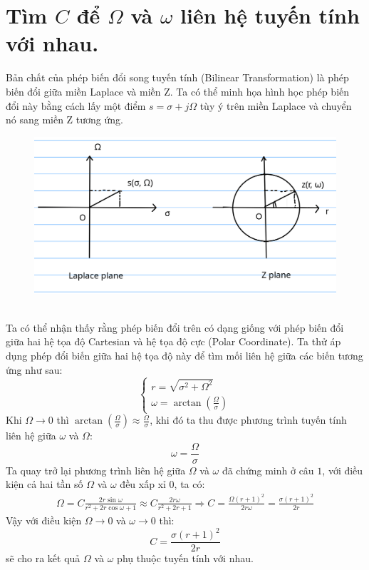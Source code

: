 \documentclass{article}
\begin{document}
\section{Tìm $C$ để $\Omega$ và $\omega$ liên hệ tuyến tính với nhau.}
Bản chất của phép biến đổi song tuyến tính (Bilinear Transformation) là phép biến đổi giữa miền Laplace và miền Z. 
Ta có thể minh họa hình học phép biến đổi này bằng cách lấy một điểm $s=\sigma+j\Omega$ tùy ý trên miền Laplace và chuyển nó sang miền Z tương ứng.
\begin{figure}[h]
    \begin{center}
    \includegraphics[width=13cm]{splane.png}
    \end{center}
    \end{figure}
\\Ta có thể nhận thấy rằng phép biến đổi trên có dạng giống với phép biến đổi giữa hai hệ tọa độ Cartesian và hệ tọa độ cực (Polar Coordinate). Ta thử áp dụng phép đổi biến giữa hai hệ tọa độ này để tìm mối liên hệ giữa các biến tương ứng như sau:
\begin{equation*}
    \begin{cases}
        r=\sqrt{\sigma^{2}+\Omega^{2}} \\
        \omega = \arctan{\left(\frac{\Omega}{\sigma}\right)}
    \end{cases}
\end{equation*}
Khi $\Omega\to0$ thì $\arctan\left(\frac{\Omega}{\sigma}\right)\approx\frac{\Omega}{\sigma}$, khi đó ta thu được phương trình tuyến tính liên hệ giữa $\omega$ và $\Omega$:
$$\omega=\frac{\Omega}{\sigma}$$
Ta quay trở lại phương trình liên hệ giữa $\Omega$ và $\omega$ đã chứng minh ở câu $1$, với điều kiện cả hai tần số $\Omega$ và $\omega$ đều xấp xỉ $0$, ta có:
\begin{equation*}
    \begin{split}
        \Omega=C\frac{2r\sin{\omega}}{r^{2}+2r\cos{\omega}+1}\approx C\frac{2r\omega}{r^2+2r+1} \Rightarrow C=\frac{\Omega(r+1)^2}{2r\omega}=\frac{\sigma(r+1)^2}{2r}
    \end{split}
\end{equation*}
Vậy với điều kiện $\Omega\to0$ và $\omega\to0$ thì: $$C=\frac{\sigma(r+1)^2}{2r}$$ sẽ cho ra kết quả $\Omega$ và $\omega$ phụ thuộc tuyến tính với nhau.
\end{document}
